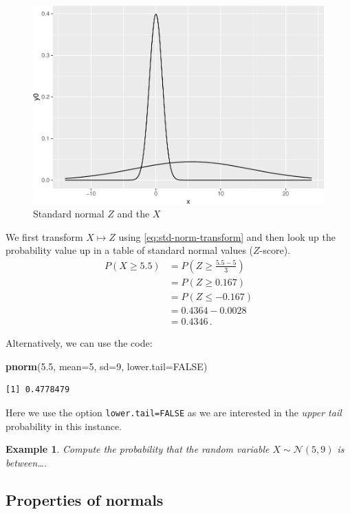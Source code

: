 \documentclass[
]{article}
\newenvironment{Shaded}{\begin{snugshade}}{\end{snugshade}}
\newcommand{\DataTypeTok}[1]{\textcolor[rgb]{0.13,0.29,0.53}{#1}}
\newcommand{\DecValTok}[1]{\textcolor[rgb]{0.00,0.00,0.81}{#1}}
\newcommand{\FloatTok}[1]{\textcolor[rgb]{0.00,0.00,0.81}{#1}}
\newcommand{\KeywordTok}[1]{\textcolor[rgb]{0.13,0.29,0.53}{\textbf{#1}}}
\newcommand{\NormalTok}[1]{#1}
\newcommand{\OtherTok}[1]{\textcolor[rgb]{0.56,0.35,0.01}{#1}}
\theoremstyle{definition}
\theoremstyle{definition}
\newtheorem{example}{Example}[section]
\theoremstyle{definition}
\theoremstyle{remark}
\begin{document}
\begin{figure}
\centering
\includegraphics{index_files/figure-latex/comp-norm-1-plot-1.pdf}
\caption{\label{fig:comp-norm-1-plot}Standard normal \(Z\) and the \(X\)}
\end{figure}

We first transform \(X \mapsto Z\) using \eqref{eq:std-norm-transform} and then look up the probability value up in a table of standard normal values (\(Z\)-score).
\[
\begin{aligned}
P(X \geq 5.5) &= P\left(Z \geq \frac{5.5 - 5}{3}\right)\\
  &= P(Z \geq 0.167)\\
  &= P(Z \leq -0.167)\\
  &=0.4364 - 0.0028\\
  &=0.4346\,.
\end{aligned}
\]

Alternatively, we can use the code:

\begin{Shaded}
\begin{Highlighting}[]
\KeywordTok{pnorm}\NormalTok{(}\FloatTok{5.5}\NormalTok{, }\DataTypeTok{mean=}\DecValTok{5}\NormalTok{, }\DataTypeTok{sd=}\DecValTok{9}\NormalTok{, }\DataTypeTok{lower.tail=}\OtherTok{FALSE}\NormalTok{)}
\end{Highlighting}
\end{Shaded}

\begin{verbatim}
[1] 0.4778479
\end{verbatim}

Here we use the option \texttt{lower.tail=FALSE} as we are interested in the \emph{upper tail} probability in this instance.

\begin{example}
\protect\hypertarget{exm:norm-comp-2}{}{\label{exm:norm-comp-2} }\emph{Compute the probability that the random variable \(X \sim \mathcal{N}(5,9)\) is between\dots.}
\end{example}

\hypertarget{properties-of-normals}{%
\subsection{Properties of normals}\label{properties-of-normals}}
\end{document}

